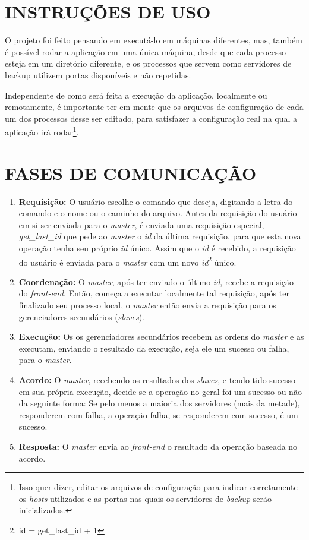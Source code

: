 \documentclass[12pt,a4paper]{article}
\begin{document}
	\section{\normalsize INSTRUÇÕES DE USO}
		O projeto foi feito pensando em executá-lo em máquinas diferentes, mas, também é possível rodar a aplicação em uma única máquina, desde que cada processo esteja em um diretório diferente, e os processos que servem como servidores de backup utilizem portas disponíveis e não repetidas.
		
		Independente de como será feita a execução da aplicação, localmente ou remotamente, é importante ter em mente que os arquivos de configuração de cada um dos processos desse ser editado, para satisfazer a configuração real na qual a aplicação irá rodar\footnote{Isso quer dizer, editar os arquivos de configuração para indicar corretamente os \textit{hosts} utilizados e as portas nas quais os servidores de \textit{backup} serão inicializados.}.
	
	\section{\normalsize FASES DE COMUNICAÇÃO}
		\begin{enumerate}
			\item \textbf{Requisição:} O usuário escolhe o comando que deseja, digitando a letra do comando e o nome ou o caminho do arquivo. Antes da requisição do usuário em si ser enviada para o \textit{master}, é enviada uma requisição especial, \textit{get\_last\_id} que pede ao \textit{master} o \textit{id} da última requisição, para que esta nova operação tenha seu próprio \textit{id} único. Assim que o \textit{id} é recebido, a requisição do usuário  é enviada para o \textit{master} com um novo \textit{id}\footnote{id = get\_last\_id + 1} único.
			
			\item \textbf{Coordenação:} O \textit{master}, após ter enviado o último \textit{id}, recebe a requisição do \textit{front-end}. Então, começa a executar localmente tal requisição, após ter finalizado seu processo local, o \textit{master} então envia a requisição para os gerenciadores secundários (\textit{slaves}).
			
			\item \textbf{Execução:} Os os gerenciadores secundários recebem as ordens do \textit{master} e as executam, enviando o resultado da execução, seja ele um sucesso ou falha, para o \textit{master}.
			
			\item \textbf{Acordo:} O \textit{master}, recebendo os resultados dos \textit{slaves}, e tendo tido sucesso em sua própria execução, decide se a operação no geral foi um sucesso ou não da seguinte forma: Se pelo menos a maioria dos servidores (mais da metade), responderem com falha, a operação falha, se responderem com sucesso, é um sucesso.
			
			\item \textbf{Resposta:} O \textit{master} envia ao \textit{front-end} o resultado da operação baseada no acordo. 
		\end{enumerate}
\end{document}
